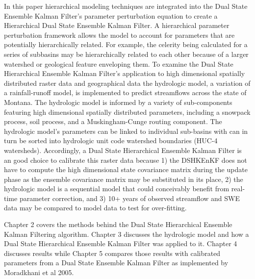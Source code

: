 	In this paper hierarchical modeling techniques are integrated into the Dual State Ensemble Kalman Filter's parameter perturbation equation to create a Hierarchical Dual State Ensemble Kalman Filter. A hierarchical parameter perturbation framework allows the model to account for parameters that are potentially hierarchically related. For example, the celerity being calculated for a series of subbasins may be hierarchically related to each other because of a larger watershed or geological feature enveloping them. To examine the Dual State Hierarchical Ensemble Kalman Filter's application to high dimensional spatially distributed raster data and geographical data the hydrologic model, a variation of a rainfall-runoff model, is implemented to predict streamflows across the state of Montana. The hydrologic model is informed by a variety of sub-components featuring high dimensional spatially distributed parameters, including a snowpack process, soil process, and a Muskingham-Cunge routing component. The hydrologic model's parameters can be linked to individual sub-basins with can in turn be sorted into hydrologic unit code watershed boundaries (HUC-4 watersheds). Accordingly, a Dual State Hierarchical Ensemble Kalman Filter is an good choice to calibrate this raster data because 1) the DSHKEnKF does not have to compute the high dimensional state covariance matrix during the update phase as the ensemble covariance matrix may be substituted in its place, 2) the hydrologic model is a sequential model that could conceivably benefit from real-time parameter correction, and 3) 10+ years of observed streamflow and SWE data may be compared to model data to test for over-fitting.
	
	Chapter 2 covers the methods behind the Dual State Hierarchical Ensemble Kalman Filtering algorithm. Chapter 3 discusses the hydrologic model and how a Dual State Hierarchical Ensemble Kalman Filter was applied to it. Chapter 4 discusses results while Chapter 5 compares those results with calibrated parameters from a Dual State Ensemble Kalman Filter as implemented by Moradkhani et al 2005.
	